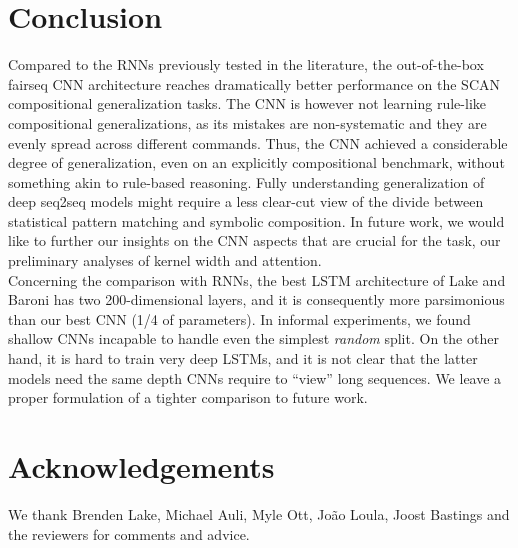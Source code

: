 \section{Conclusion}

Compared to the RNNs previously tested in the
literature, the out-of-the-box fairseq CNN architecture reaches
dramatically better performance on the SCAN compositional
generalization tasks. The CNN
is however not  learning rule-like compositional generalizations, as its
mistakes are non-systematic and they are evenly spread across different
commands. Thus, the CNN  achieved a considerable
degree of generalization, even on an explicitly compositional
benchmark, without something akin to rule-based reasoning. Fully
understanding generalization of deep seq2seq models might require a less
clear-cut view of the divide between statistical pattern matching and
symbolic composition. In future work, we would like to further our insights on the
CNN aspects that are crucial for the task,  our preliminary
analyses of kernel width and attention.
\\
Concerning the comparison with RNNs, the best LSTM architecture of
Lake and Baroni has two 200-dimensional layers, and it is consequently
more parsimonious than our best CNN (1/4 of parameters). In informal
experiments, we found shallow CNNs incapable to handle even the
simplest \emph{random} split. On the other hand, it is hard to train
very deep LSTMs, and it is not clear that the latter models need the
same depth CNNs require to ``view'' long sequences. We
leave a proper formulation of a tighter comparison to future work.

\section*{Acknowledgements}
We thank Brenden Lake, Michael Auli, Myle Ott, Jo\~ao Loula, Joost Bastings and the reviewers for comments and advice.
